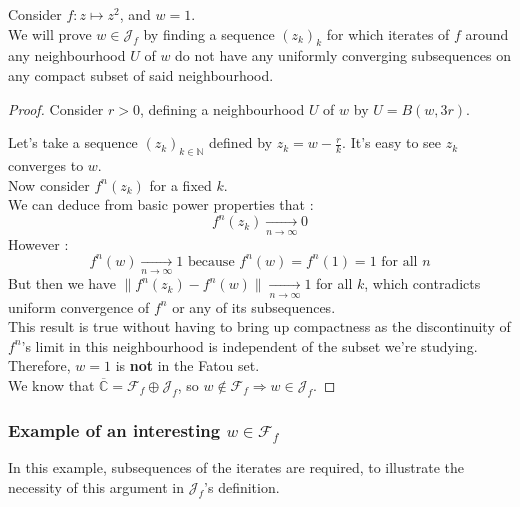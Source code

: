 \documentclass{article}
\newcommand\N{\mathbb{N}}
\newcommand\C{\mathbb{C}}
\begin{document}
Consider $f : z \mapsto z^2$, and $w = 1$. \\
\vspace{5mm}
We will prove $w \in \mathcal{J}_f$ by finding a sequence $(z_k)_k$ for which iterates of $f$ around any neighbourhood $U$ of $w$ do not have any uniformly converging subsequences on any compact subset of said neighbourhood. \\
\vspace{5mm}
\begin{proof}
Consider $r > 0$, defining a neighbourhood $U$ of $w$ by $U = B(w,3r)$. \\
\vspace{2mm}

Let's take a sequence $(z_k)_{k \in \N}$ defined by $z_k = w - \frac{r}{k}$. It's easy to see $z_k$ converges to $w$. \\
\vspace{5mm}
Now consider $f^n(z_k)$ for a fixed $k$. \\
We can deduce from basic power properties that : \\
$$f^n(z_k) \underset{n \to \infty}{\longrightarrow} 0$$
However : \\
$$f^n(w) \underset{n \to \infty}{\longrightarrow} 1 \text{ because } f^n(w) = f^n(1) = 1 \text{ for all } n$$
But then we have $\lVert f^n(z_k) - f^n(w) \rVert \underset{n \to \infty}{\longrightarrow} 1$ for all $k$, which contradicts uniform convergence of $f^n$ or any of its subsequences. \\
This result is true without having to bring up compactness as the discontinuity of $f^n$'s limit in this neighbourhood is independent of the subset we're studying. \\
\vspace{2mm}
Therefore, $w = 1$ is \textbf{not} in the Fatou set. \\
\vspace{5mm}
We know that $\overline{\C} = \mathcal{F}_f \oplus \mathcal{J}_f$, so $w \notin \mathcal{F}_f \Rightarrow w \in \mathcal{J}_f$. 
\end{proof}

\subsubsection{Example of an interesting $w \in \mathcal{F}_f$}

In this example, subsequences of the iterates are required, to illustrate the necessity of this argument in $\mathcal{J}_f$'s definition. \\
\vspace{5mm}
\end{document}
